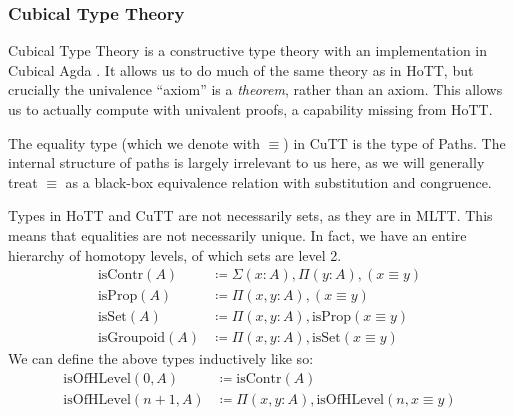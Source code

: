 \subsubsection{Cubical Type Theory}
Cubical Type Theory \cite{cohenCubicalTypeTheory2016} is a constructive type
theory with an implementation in Cubical Agda
\cite{vezzosiCubicalAgdaDependently2019}.
It allows us to do much of the same theory as in HoTT, but crucially the
univalence ``axiom'' is a \emph{theorem}, rather than an axiom.
This allows us to actually compute with univalent proofs, a capability missing
from HoTT.
\begin{romdefinition}
  The equality type (which we denote with \(\equiv\)) in CuTT is the type of
  Paths\footnotemark.
  The internal structure of paths is largely irrelevant to us here, as we will
  generally treat \(\equiv\) as a black-box equivalence relation with
  substitution and congruence.
\end{romdefinition}

\begin{romdefinition}
  Types in HoTT and CuTT are not necessarily sets, as they are in MLTT.
  This means that equalities are not necessarily unique.
  In fact, we have an entire hierarchy of homotopy levels, of which sets are
  level 2.
  \begin{align}
    \text{isContr}(A)    &\coloneqq \Sigma(x : A) , \Pi(y : A) , (x \equiv y) \\
    \text{isProp}(A)     &\coloneqq \Pi(x, y : A) , (x \equiv y) \\
    \text{isSet}(A)      &\coloneqq \Pi(x, y : A) , \text{isProp}(x \equiv y) \\
    \text{isGroupoid}(A) &\coloneqq \Pi(x, y : A) , \text{isSet}(x \equiv y)
  \end{align}
  We can define the above types inductively like so:
  \begin{align}
    \text{isOfHLevel}(0 , A) &\coloneqq \text{isContr}(A) \\
    \text{isOfHLevel}(n+1 , A) &\coloneqq \Pi(x , y : A) , \text{isOfHLevel}(n , x \equiv y)
  \end{align}
  
\end{romdefinition}


